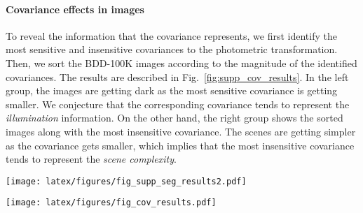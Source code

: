 \documentclass[final]{latex/cvpr}
\begin{document}
\paragraph{Covariance effects in images}
To reveal the information that the covariance represents, 
we first identify the most sensitive and insensitive covariances to the photometric transformation. Then, we sort the BDD-100K images according to the magnitude of the identified covariances.
The results are described in Fig.~\ref{fig:supp_cov_results}. In the left group, the images are getting dark as the most sensitive covariance is getting smaller. We conjecture that the corresponding covariance tends to represent the \emph{illumination} information. On the other hand, the right group shows the sorted images along with the most insensitive covariance. The scenes are getting simpler as the covariance gets smaller, which implies that the most insensitive covariance tends to represent the \textit{scene complexity}.





\begin{figure*}[!t]
\vspace*{-0.3cm}
\centering
  \texttt{[image: latex/figures/fig\_supp\_seg\_results2.pdf]}
  \caption{Segmentation results under various circumstances in BDD-100K with the models trained on Cityscapes. Circumstances include adverse weather conditions (\textit{i.e.,} snow and fog), unseen structures (\textit{i.e.,} parking lot and overpass), and vegetation.}
\label{fig:supp_seg_result_various}
\vspace*{-0.3cm}
\end{figure*}

\begin{figure*}[!t]
\centering
  \texttt{[image: latex/figures/fig\_cov\_results.pdf]}
\caption{Tendency of images in BDD-100K dataset along with the covariance changes.}
\label{fig:supp_cov_results}
\vspace*{+1.0cm}
\end{figure*}
\end{document}
